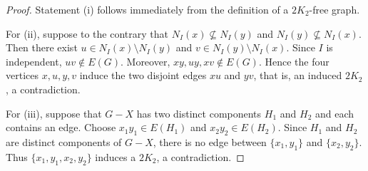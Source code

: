 \documentclass[11pt]{article}
\numberwithin{equation}{section}
\theoremstyle{plain}
\theoremstyle{definition}
\theoremstyle{plain}
\begin{document}
\begin{proof}
Statement (i) follows immediately from the definition of a
$2K_2$-free graph.

For (ii), suppose to the contrary that $N_I(x)\not\subseteq N_I(y)$ and $N_I(y)\not\subseteq N_I(x)$. Then there exist
$u\in N_I(x)\setminus N_I(y)$ and $v\in N_I(y)\setminus N_I(x)$.
Since $I$ is independent, $uv\notin E(G)$. Moreover,
$xy,uy,xv\notin E(G)$. Hence the four vertices $x,u,y,v$
induce the two disjoint edges $xu$ and $yv$, that is,
an induced $2K_2$, a contradiction.

For (iii), suppose that $G-X$ has two distinct components
$H_1$ and $H_2$ and each contains an edge. Choose
    $x_1y_1\in E(H_1)$ and 
    $x_2y_2\in E(H_2)$.
Since $H_1$ and $H_2$ are distinct components of $G-X$, there is
no edge between $\{x_1,y_1\}$ and $\{x_2,y_2\}$. Thus
$\{x_1,y_1,x_2,y_2\}$ induces a $2K_2$, a contradiction.
\end{proof}
\end{document}
